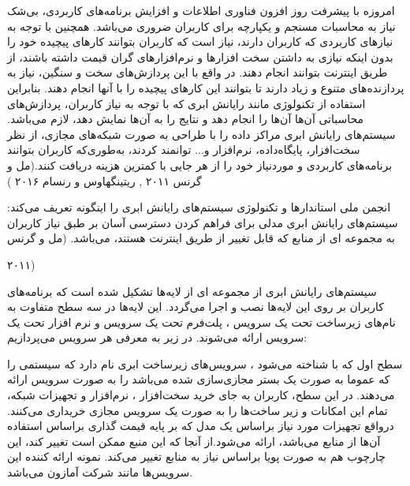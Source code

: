 \label{فصل‌مقدمه}
 امروزه با پیشرفت روز افزون فناوری اطلاعات و افزایش برنامه‌های کاربردی، 
 بی‌شک نیاز به محاسبات مسنجم و یکپارچه برای کاربران ضروری می‌باشد.
 همچنین با توجه به نیازهای کاربردی که کاربران دارند، 
 نیاز است که کاربران بتوانند کارهای پیچیده خود را بدون  اینکه 
 نیازی به داشتن سخت افزارها و نرم‌افزارهای گران قیمت داشته باشند، 
 از طریق اینترنت بتوانند انجام دهند. در واقع با این پردازش‌های سخت و سنگین، 
 نیاز به پردازنده‌های متنوع و زیاد دارند تا بتوانند این کارهای پیچیده را با آنها انجام دهند. بنابراین استفاده از تکنولوژی مانند رایانش ابری که با توجه به نیاز کاربران، پردازش‌های محاسباتی آن‌ها آن‌ها را انجام دهد و نتایج را به آن‌ها 
 نمایش دهد، لازم می‌باشد. سیستم‌های رایانش ابری مراکز داده را با طراحی به صورت شبکه‌های مجازی، از نظر سخت‌افزار، پایگاه‌داده، نرم‌افزار و... توانمند کردند، 
 به‌طوری‌که کاربران بتوانند برنامه‌های کاربردی و موردنیاز خود را از هر جایی  با کمترین هزینه دریافت کنند.(مل و گرنس
   ۲۰۱۱ , ریتینگهاوس و رنسام
    ۲۰۱۶ )
  
  انجمن ملی استاندارها و تکنولوژی سیستم‌های رایانش ابری را اینگونه تعریف می‌کند: سیستم‌های رایانش ابری مدلی برای فراهم کردن دسترسی آسان بر طبق نیاز کاربران به مجموعه ای از منابع که قابل تغییر از طریق اینترنت هستند، می‌باشد.
  (مل و گرنس
  
   ۲۰۱۱)


   سیستم‌های رایانش ابری از مجموعه ای از لایه‌ها تشکیل شده است که برنامه‌های کاربران بر روی این لایه‌ها نصب و اجرا می‌گردد. این لایه‌ها در سه سطح متفاوت به نام‌های زیرساخت تحت یک سرویس
    ، پلت‌فرم تحت یک سرویس
     و نرم ‌افزار تحت یک سرویس
     ارائه می‌شوند. در زیر به معرفی هر سرویس می‌پردازیم:

 سطح اول که با 
 شناخته می‌شود ، سرویس‌های زیرساخت ابری نام دارد که سیستمی‌ را که عموما به صورت یک بستر مجازی‌سازی شده می‌باشد را به صورت سرویس ارائه می‌دهند. در این سطح، کاربران به جای خرید سخت‌افزار ، نرم‌افزار و تجهیزات شبکه، تمام این امکانات و زیر ساخت‌ها را به صورت یک سرویس مجازی خریداری می‌کنند. درواقع تجهیزات مورد نیاز براساس یک مدل که بر پایه قیمت گذاری براساس استفاده آن‌ها از منابع می‌باشد، ارائه می‌شود.از آنجا که این منبع ممکن است تغییر کند، این چارچوب هم به صورت پویا براساس نیاز به منابع تغییر می‌کند. نمونه ارائه کننده این سرویس‌ها مانند شرکت آمازون می‌باشد.
   
